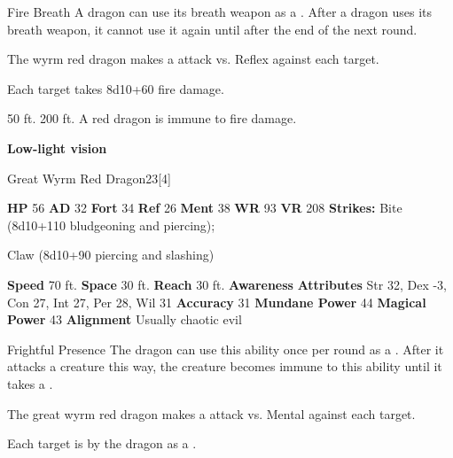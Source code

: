     \begin{freeability}{Fire Breath}
      A dragon can use its breath weapon as a .
      After a dragon uses its breath weapon, it cannot use it again until after the end of the next round.
      \par The wyrm red dragon makes a  attack
        vs. Reflex against each target.
    
    \hit Each target takes 8d10+60 fire damage.
    \end{freeability}
  
      
       50 ft.
     200 ft.
     A red dragon is immune to fire damage.
    \par\noindent\textbf{Low-light vision}
  

  \begin{monsubsection}{Great Wyrm Red Dragon}{23}[4]
    \vspace{-1em}\vspace{-1em}
    \vspace{0em}

    
    

    \begin{spellcontent}
      \begin{spelltargetinginfo}
        \pari \textbf{HP} 56 \monsep
          \textbf{AD} 32 \monsep
          \textbf{Fort} 34 \monsep
          \textbf{Ref} 26 \monsep
          \textbf{Ment} 38
        \pari \textbf{WR} 93 \monsep
        \textbf{VR} 208
        \pari \textbf{Strikes:}
            Bite  (8d10+110 bludgeoning and piercing);
\par Claw  (8d10+90 piercing and slashing)
      \end{spelltargetinginfo}
    \end{spellcontent}
    \begin{monsterfooter}
      \pari \textbf{Speed} 70 ft. \monsep
        \textbf{Space} 30 ft. \monsep
        \textbf{Reach} 30 ft.
      \pari \textbf{Awareness} 
      \pari \textbf{Attributes}
        Str 32, Dex -3,
        Con 27, Int 27,
        Per 28, Wil 31
      \pari \textbf{Accuracy} 31 \monsep
        \textbf{Mundane Power} 44 \monsep
      \textbf{Magical Power} 43
      \pari \textbf{Alignment} Usually chaotic evil
    \end{monsterfooter}
  \end{monsubsection}
  \begin{freeability}{Frightful Presence}
      The dragon can use this ability once per round as a .
      After it attacks a creature this way, the creature becomes immune to this ability until it takes a .
      \par The great wyrm red dragon makes a  attack
        vs. Mental against each target.
    
    \hit Each target is  by the dragon as a .
    \end{freeability}
  

